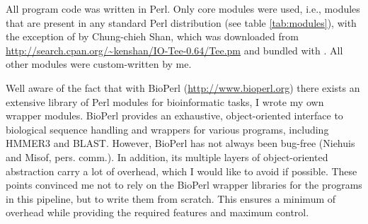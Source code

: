 All program code was written in Perl. Only core modules were used, i.e., modules
that are present in any standard Perl distribution (see table \ref{tab:modules}),
with the exception of  by Chung-chieh Shan, which was downloaded
from \url{http://search.cpan.org/~kenshan/IO-Tee-0.64/Tee.pm} and bundled with
\pname. All other modules were custom-written by me.

Well aware of the fact that with BioPerl (\url{http://www.bioperl.org}) there
exists an extensive library of Perl modules for bioinformatic tasks, I wrote my
own wrapper modules. BioPerl provides an exhaustive, object-oriented interface
to biological sequence handling and wrappers for various programs, including
HMMER3 and BLAST. However, BioPerl has not always been bug-free (Niehuis and
Misof, pers. comm.). In addition, its multiple layers of object-oriented
abstraction carry a lot of overhead, which I would like to avoid if possible.
These points convinced me not to rely on the BioPerl wrapper libraries for the
programs in this pipeline, but to write them from scratch. This ensures a
minimum of overhead while providing the required features and maximum control.


